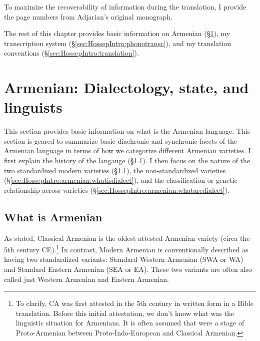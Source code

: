 \begin{center}
\end{center}

To maximize the recoverability of information during the translation, I provide the page numbers from Adjarian's original monograph. 

The rest of this chapter provides basic information on Armenian (\S\ref{sec:HossepIntro:armenian}), my transcription system (\S\ref{sec:HossepIntro:phonotransc}),   and my translation conventions (\S\ref{sec:HossepIntro:translation}).



\section{Armenian: Dialectology, state, and linguists}\label{sec:HossepIntro:armenian}


This section provides basic information on what is the Armenian language. This section is geared to summarize basic diachronic and synchronic facets of the Armenian language in terms of how we categorize different Armenian varieties. I first explain the history of the langauge (\S\ref{sec:HossepIntro:armenian:whatisarm}). I then focus on the nature of the two standardized modern varieties  (\S\ref{sec:HossepIntro:armenian:whatisarm}), the non-standardized varieties (\S\ref{sec:HossepIntro:armenian:whatisdialect}), and the classification or genetic relationship across   varieties (\S\ref{sec:HossepIntro:armenian:whataredialect}). 
\subsection{What is Armenian}\label{sec:HossepIntro:armenian:whatisarm}

As stated, Classical Armenian is the oldest attested Armenian variety (circa the 5th century CE).\footnote{To clarify, CA was first attested in the 5th century in written form in a Bible translation. Before this initial attestation, we don't know what was the linguistic situation for Armenians. It is often assumed that were a stage of Proto-Armenian between Proto-Indo-European and Classical Armenian. } In contrast, Modern Armenian is conventionally described as having two standardized variants: Standard Western Armenian (SWA or WA) and Standard Eastern Armenian (SEA or EA). These two variants are often also called just Western Armenian and Eastern Armenian. 

